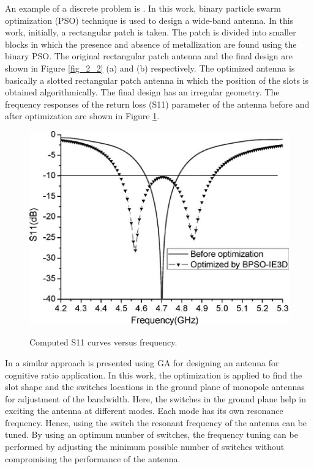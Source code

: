 An example of a discrete problem is \cite{optPatch}. In this work, binary particle swarm optimization (PSO) technique is used to design a wide-band antenna. In this work, initially, a rectangular patch is taken. The patch is divided into smaller blocks in which the presence and absence of metallization are found using the binary PSO. The original rectangular patch antenna and the final design are shown in Figure \ref{fig_2_2} (a) and (b) respectively. The optimized antenna is basically a slotted rectangular patch antenna in which the position of the slots is obtained algorithmically. The final design has an irregular geometry. The frequency responses of the return loss (S11) parameter of the antenna before and after optimization are shown in Figure \ref{fig_2_3}.

\begin{figure}
  \centering
  \includegraphics[width=0.3\linewidth]{fig_2_3.eps}\\
  \caption{Computed S11 curves versus frequency. \cite{patch_miniaturize_ga}} \label{fig_2_3}
\end{figure}

In \cite{freqReconfCogn} a similar approach is presented using GA for designing an antenna for cognitive ratio application. In this work, the optimization is applied to find the slot shape and the switches locations in the ground plane of monopole antennas for adjustment of the bandwidth. Here, the switches in the ground plane help in exciting the antenna at different modes. Each mode has its own resonance frequency. Hence, using the switch the resonant frequency of the antenna can be tuned. By using an optimum number of switches, the frequency tuning can be performed by adjusting the minimum possible number of switches without compromising the performance of the antenna.

